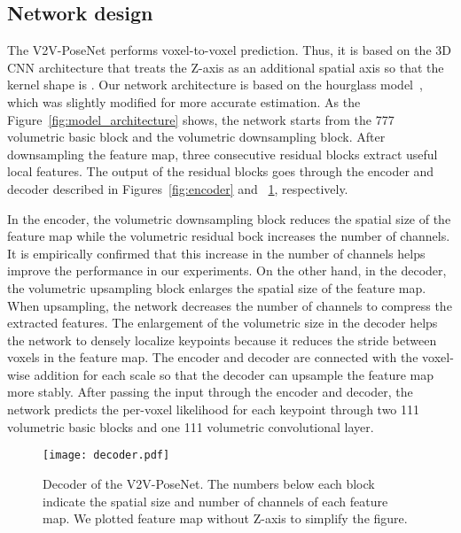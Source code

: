 \documentclass[10pt,twocolumn,letterpaper]{article}
\begin{document}
\subsection{Network design}
The V2V-PoseNet performs voxel-to-voxel prediction. Thus, it is based on the 3D CNN architecture that treats the Z-axis as an additional spatial axis so that the kernel shape is . Our network architecture is based on the hourglass model~\cite{newell2016stacked}, which was slightly modified for more accurate estimation. As the Figure~\ref{fig:model_architecture} shows, the network starts from the 777 volumetric basic block and the volumetric downsampling block. After downsampling the feature map, three consecutive residual blocks extract useful local features. The output of the residual blocks goes through the encoder and decoder described in Figures~\ref{fig:encoder} and ~\ref{fig:decoder}, respectively.

In the encoder, the volumetric downsampling block reduces the spatial size of the feature map while the volumetric residual bock increases the number of channels. It is empirically confirmed that this increase in the number of channels helps improve the performance in our experiments. On the other hand, in the decoder, the volumetric upsampling block enlarges the spatial size of the feature map. When upsampling, the network decreases the number of channels to compress the extracted features. The enlargement of the volumetric size in the decoder helps the network to densely localize keypoints because it reduces the stride between voxels in the feature map. The encoder and decoder are connected with the voxel-wise addition for each scale so that the decoder can upsample the feature map more stably. After passing the input through the encoder and decoder, the network predicts the per-voxel likelihood for each keypoint through two 111 volumetric basic blocks and one 111 volumetric convolutional layer.


\begin{figure}[t]
\begin{center}
   \texttt{[image: decoder.pdf]}
\end{center}
\vspace*{-5mm}
   \caption{Decoder of the V2V-PoseNet. The numbers below each block indicate the spatial size and number of channels of each feature map. We plotted feature map without Z-axis to simplify the figure.}
\vspace*{-4mm}
\label{fig:decoder}
\end{figure}
\end{document}
